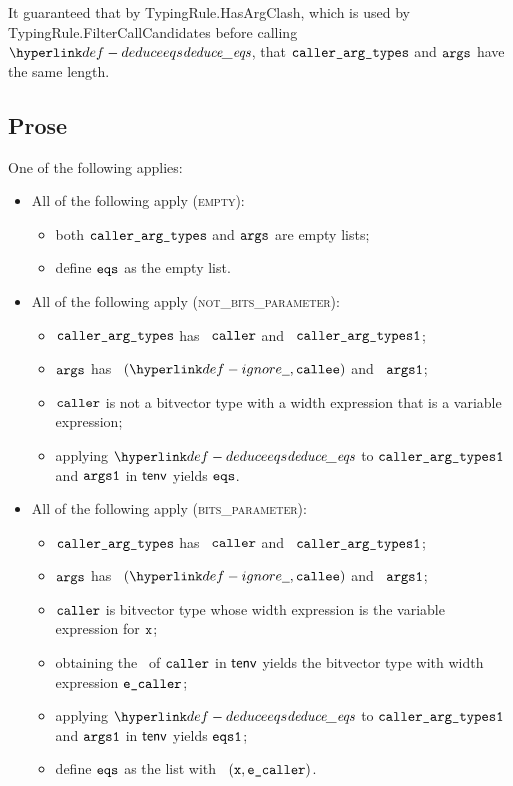 It guaranteed that by TypingRule.HasArgClash,
which is used by \\ TypingRule.FilterCallCandidates before calling $\deduceeqs$,
that $\texttt{caller\_arg\_types}$ and $\texttt{args}$ have the same length.

\subsection{Prose}
One of the following applies:
\begin{itemize}
  \item All of the following apply (\textsc{empty}):
  \begin{itemize}
    \item both $\texttt{caller\_arg\_types}$ and $\texttt{args}$ are empty lists;
    \item define $\texttt{eqs}$ as the empty list.
  \end{itemize}

  \item All of the following apply (\textsc{not\_bits\_parameter}):
  \begin{itemize}
    \item $\texttt{caller\_arg\_types}$ has \head\ $\texttt{caller}$ and \tail\ $\texttt{caller\_arg\_types1}$;
    \item $\texttt{args}$ has \head\ $(\Ignore, \callee)$ and \tail\ $\texttt{args1}$;
    \item $\texttt{caller}$ is not a bitvector type with a width expression that is a variable expression;
    \item applying $\deduceeqs$ to $\texttt{caller\_arg\_types1}$ and $\texttt{args1}$ in $\textsf{tenv}$ yields $\texttt{eqs}$.
  \end{itemize}

  \item All of the following apply (\textsc{bits\_parameter}):
  \begin{itemize}
    \item $\texttt{caller\_arg\_types}$ has \head\ $\texttt{caller}$ and \tail\ $\texttt{caller\_arg\_types1}$;
    \item $\texttt{args}$ has \head\ $(\Ignore, \callee)$ and \tail\ $\texttt{args1}$;
    \item $\texttt{caller}$ is bitvector type whose width expression is the variable expression for $\texttt{x}$;
    \item obtaining the \structure\ of $\texttt{caller}$ in $\textsf{tenv}$ yields the bitvector type with width expression $\texttt{e\_caller}$\ProseOrTypeError;
    \item applying $\deduceeqs$ to $\texttt{caller\_arg\_types1}$ and $\texttt{args1}$ in $\textsf{tenv}$ yields $\texttt{eqs1}$;
    \item define $\texttt{eqs}$ as the list with \head\ $(\texttt{x}, \texttt{e\_caller})$.
  \end{itemize}
\end{itemize}

